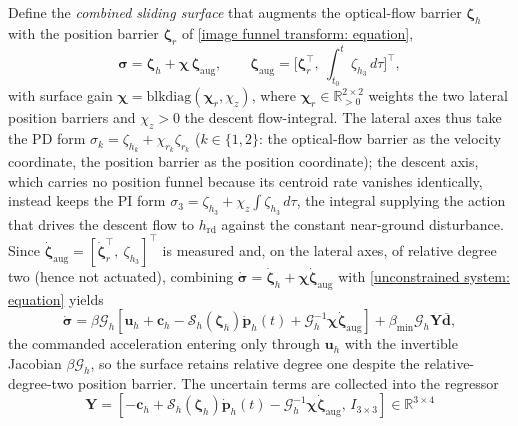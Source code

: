 \documentclass{IEEEtaes}
\theoremstyle{definition}
\theoremstyle{remark}
\begin{document}
Define the \emph{combined sliding surface} that augments the optical-flow barrier $\boldsymbol{\zeta}_h$ with the position barrier $\boldsymbol{\zeta}_r$ of \eqref{image funnel transform: equation},
\begin{equation} \label{sliding surface: equation}
    \boldsymbol{\sigma} = \boldsymbol{\zeta}_h + \boldsymbol{\chi}\,\boldsymbol{\zeta}_\text{aug},\qquad \boldsymbol{\zeta}_\text{aug}=\big[\boldsymbol{\zeta}_r^\top,\ \textstyle\int_{t_0}^{t}\zeta_{h_3}\,d\tau\big]^\top,
\end{equation}
with surface gain $\boldsymbol{\chi}=\text{blkdiag}(\boldsymbol{\chi}_r,\chi_z)$, where $\boldsymbol{\chi}_r\in\mathbb{R}^{2\times2}_{>0}$ weights the two lateral position barriers and $\chi_z>0$ the descent flow-integral. The lateral axes thus take the PD form $\sigma_k=\zeta_{h_k}+\chi_{r_k}\zeta_{r_k}$ ($k\in\{1,2\}$: the optical-flow barrier as the velocity coordinate, the position barrier as the position coordinate); the descent axis, which carries no position funnel because its centroid rate vanishes identically, instead keeps the PI form $\sigma_3=\zeta_{h_3}+\chi_z\!\int\zeta_{h_3}\,d\tau$, the integral supplying the action that drives the descent flow to $h_\text{rd}$ against the constant near-ground disturbance. Since $\dot{\boldsymbol{\zeta}}_\text{aug}=[\dot{\boldsymbol{\zeta}}_r^\top,\ \zeta_{h_3}]^\top$ is measured and, on the lateral axes, of relative degree two (hence not actuated), combining $\dot{\boldsymbol{\sigma}}=\dot{\boldsymbol{\zeta}}_h+\boldsymbol{\chi}\dot{\boldsymbol{\zeta}}_\text{aug}$ with \eqref{unconstrained system: equation} yields
\begin{equation} \label{sigma derivative: equation 2}
    \dot{\boldsymbol{\sigma}} = \beta\mathcal{G}_h\!\left[\boldsymbol{u}_h+\boldsymbol{c}_h-\mathcal{S}_h(\boldsymbol{\zeta}_h)\dot{\boldsymbol{p}}_h(t)+\mathcal{G}_h^{-1}\boldsymbol{\chi}\dot{\boldsymbol{\zeta}}_\text{aug}\right] + \beta_{\min}\mathcal{G}_h\boldsymbol{Y}\boldsymbol{\overline{d}},
\end{equation}
the commanded acceleration entering only through $\boldsymbol{u}_h$ with the invertible Jacobian $\beta\mathcal{G}_h$, so the surface retains relative degree one despite the relative-degree-two position barrier. The uncertain terms are collected into the regressor
\begin{equation} \label{regressor: equation}
    \boldsymbol{Y} = [-\boldsymbol{c}_h+\mathcal{S}_h(\boldsymbol{\zeta}_h)\dot{\boldsymbol{p}}_h(t)-\mathcal{G}_h^{-1}\boldsymbol{\chi}\dot{\boldsymbol{\zeta}}_\text{aug},\,I_{3\times 3}]\in\mathbb{R}^{3\times 4}
\end{equation}
\end{document}
